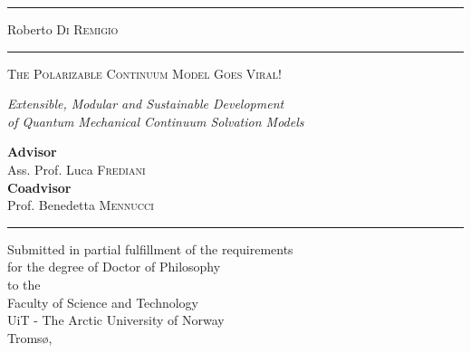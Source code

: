 
\begin{titlepage}
  \begingroup%
  \textheight
  \begin{minipage}[t]{0.05\textwidth}
    \color{brewerBlue}
    \rule{6pt}{\textheight}
  \end{minipage}
  \hspace{0.05\textwidth}
  \begin{minipage}[t]{0.8\textwidth}
    \vspace*{0.5\drop}
    {\LARGE Roberto \textsc{Di Remigio}} \\
    \rule{\textwidth}{1pt} \par
    \vspace{3\baselineskip}
    {\noindent\Huge\color{brewerBlue}\scshape
    The Polarizable Continuum Model Goes Viral!} \par
    \vspace{2\baselineskip}
    {\Large\itshape Extensible, Modular and Sustainable Development
    \\
    of Quantum Mechanical Continuum Solvation Models} \par
    \vspace{6.5\baselineskip}
    {
    \large \textbf{Advisor}
    \\
    Ass. Prof. Luca \textsc{Frediani}
    \\[0.1\drop]
    \textbf{Coadvisor}
    \\
    Prof. Benedetta \textsc{Mennucci}
    } \par
    \vspace{\baselineskip}
    \rule{\textwidth}{1pt} \par
    {\small\itshape
    \begin{center}
      Submitted in partial fulfillment of the requirements
      \\
      for the degree of Doctor of Philosophy
      \\[0.1\drop]
      \textnormal{to the}
      \\[0.1\drop]
      Faculty of Science and Technology
      \\
      UiT - The Arctic University of Norway
      \\
      Tromsø, \myTime
    \end{center}
    }
  \end{minipage}
  \endgroup
\end{titlepage}
\restoregeometry
